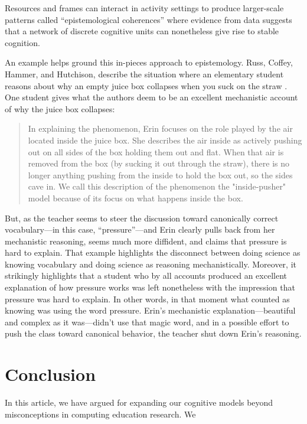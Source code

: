 Resources and frames can interact in activity settings to produce
larger-scale patterns called ``epistemological coherences'' \cite{rosenberg_multiple_2006} where evidence from data suggests that a
network of discrete cognitive units can nonetheless give rise to stable
cognition.

An example helps ground this in-pieces approach to epistemology. Russ, Coffey, Hammer, and Hutchison, describe the
situation where an elementary student reasons about why an empty juice
box collapses when you suck on the straw \cite{russ_making_2008}. One student gives what the
authors deem to be an excellent mechanistic account of why the juice box
collapses:

\begin{quote}
  In explaining the phenomenon, Erin focuses on the role played by the air located inside the juice box. She describes the air inside as actively pushing out on all sides of the box holding them out and flat. When that air is removed from the box (by sucking it out through the straw), there is no longer anything pushing from the inside to hold the box out, so the sides cave in. We call this description of the phenomenon the "inside-pusher" model because of its focus on what happens inside the box. \cite{russ_making_2008}
\end{quote}

But, as the teacher seems to steer the discussion toward canonically correct
vocabulary---in this case, ``pressure''---and Erin clearly pulls back
from her mechanistic reasoning, seems much more diffident, and claims
that pressure is hard to explain. That example highlights the disconnect
between doing science as knowing vocabulary and doing science as
reasoning mechanistically. Moreover, it strikingly highlights that a
student who by all accounts produced an excellent explanation of how
pressure works was left nonetheless with the impression that pressure
was hard to explain. In other words, in that moment what counted as knowing was using the word pressure. Erin's mechanistic explanation---beautiful and complex as it was---didn't use that magic word, and in a possible effort to push the class toward canonical behavior, the teacher shut down Erin's reasoning.

\section{Conclusion}

In this article, we have argued for expanding our cognitive models beyond misconceptions in computing education research. We

